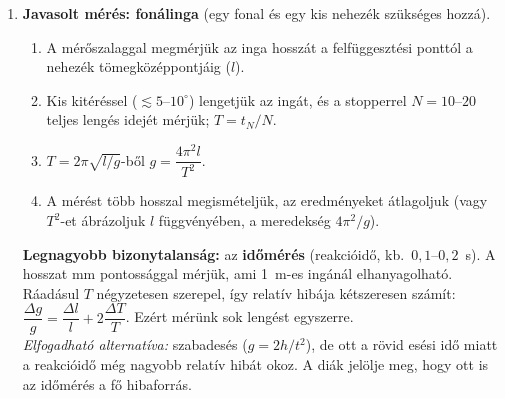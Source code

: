 \documentclass[11pt,a4paper]{article}
\begin{document}
\begin{enumerate}[leftmargin=*,label=\textbf{\arabic*.},itemsep=9pt,topsep=0pt,parsep=0pt]
\item \textbf{Javasolt mérés: fonálinga} (egy fonal és egy kis nehezék szükséges hozzá).
\begin{enumerate}[nosep,leftmargin=1.5em,label=\arabic*)]
  \item A mérőszalaggal megmérjük az inga hosszát a felfüggesztési ponttól a nehezék
    tömegközéppontjáig ($l$).
  \item Kis kitéréssel ($\lesssim 5$--$10^\circ$) lengetjük az ingát, és a stopperrel
    $N = 10$--$20$ teljes lengés idejét mérjük; $T = t_N/N$.
  \item $T = 2\pi\sqrt{l/g}$-ből $g = \dfrac{4\pi^2 l}{T^2}$.
  \item A mérést több hosszal megismételjük, az eredményeket átlagoljuk (vagy $T^2$-et
    ábrázoljuk $l$ függvényében, a meredekség $4\pi^2/g$).
\end{enumerate}
\textbf{Legnagyobb bizonytalanság:} az \textbf{időmérés} (reakcióidő, kb.\
$0{,}1$--$0{,}2$~s). A hosszat mm pontossággal mérjük, ami 1~m-es ingánál elhanyagolható.
Ráadásul $T$ négyzetesen szerepel, így relatív hibája kétszeresen számít:
$\dfrac{\Delta g}{g} = \dfrac{\Delta l}{l} + 2\dfrac{\Delta T}{T}$. Ezért mérünk sok
lengést egyszerre. \\
\emph{Elfogadható alternatíva:} szabadesés ($g = 2h/t^2$), de ott a rövid esési idő miatt
a reakcióidő még nagyobb relatív hibát okoz. A diák jelölje meg, hogy ott is az
időmérés a fő hibaforrás.

\end{enumerate}
\end{document}
